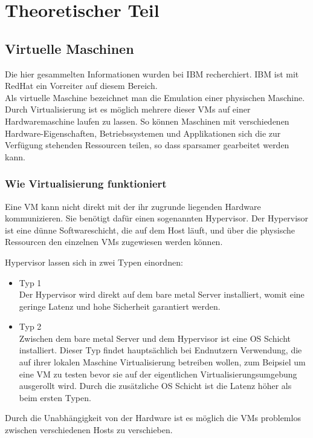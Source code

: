 \chapter{Theoretischer Teil}

\section{Virtuelle Maschinen} 
Die hier gesammelten Informationen wurden bei IBM\cite{vm} recherchiert. IBM ist mit RedHat ein Vorreiter auf diesem Bereich.\\
Als virtuelle Maschine bezeichnet man die Emulation einer physischen Maschine.
Durch Virtualisierung ist es möglich mehrere dieser \ac{VM}s auf einer Hardwaremaschine laufen zu lassen.
So können Maschinen mit verschiedenen Hardware-Eigenschaften, Betriebssystemen und Applikationen sich die zur Verfügung stehenden Ressourcen teilen, so dass sparsamer gearbeitet werden kann.

\subsection{Wie Virtualisierung funktioniert}
Eine \ac{VM} kann nicht direkt mit der ihr zugrunde liegenden Hardware kommunizieren. 
Sie benötigt dafür einen sogenannten Hypervisor.
Der Hypervisor ist eine dünne Softwareschicht, die auf dem Host läuft, und über die physische Ressourcen den einzelnen \ac{VM}s zugewiesen werden können.

Hypervisor lassen sich in zwei Typen einordnen:
\begin{itemize}
    \item Typ 1 \\ 
            Der Hypervisor wird direkt auf dem bare metal Server installiert, womit eine geringe Latenz und hohe Sicherheit garantiert werden.
    \item Typ 2\\
            Zwischen dem bare metal Server und dem Hypervisor ist eine \ac{OS} Schicht installiert. 
            Dieser Typ findet hauptsächlich bei Endnutzern Verwendung, die auf ihrer lokalen Maschine Virtualisierung betreiben wollen, zum Beipsiel um eine \ac{VM} zu testen bevor sie auf der eigentlichen Virtualisierungsumgebung ausgerollt wird.
            Durch die zusätzliche \ac{OS} Schicht ist die Latenz höher als beim ersten Typen.
\end{itemize}

Durch die Unabhängigkeit von der Hardware ist es möglich die \ac{VM}s problemlos zwischen verschiedenen Hosts zu verschieben. \\

